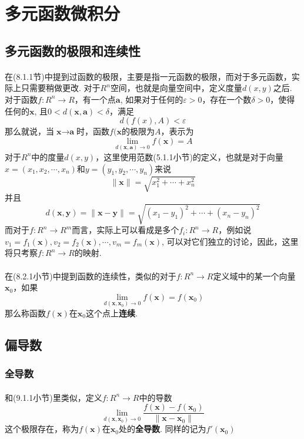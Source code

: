 \section{多元函数微积分}

\subsection{多元函数的极限和连续性}
\paragraph{}
在(8.1.1节)中提到过函数的极限，主要是指一元函数的极限，而对于多元函数，实际上只需要稍做更改. 对于$R^n$空间，也就是向量空间中，定义度量$d(x, y)$之后. 对于函数$f: R^n \to R$，有一个点$\textbf{a}$, 如果对于任何的$\varepsilon > 0$，存在一个数$\delta > 0$，使得任何的$\textbf{x}$, 且$0 < d(\textbf{x}, \textbf{a}) < \delta$，满足
$$
d(f(x), A) < \varepsilon
$$
那么就说，当$\textbf{x} \to \textbf{a}$时，函数$f(\textbf{x}$的极限为$A$，表示为
$$
\lim_{d(\textbf{x}, \textbf{a}) \to 0} f(\textbf{x}) = A
$$
对于$R^n$中的度量$d(x, y)$，这里使用范数(5.1.1小节)的定义，也就是对于向量$x = (x_1, x_2, \cdots, x_n)$和$y = (y_1, y_2, \cdots, y_n)$来说
$$
\parallel \textbf{x} \parallel = \sqrt{x_1^2 + \cdots + x_n^2}
$$
并且
$$
d(\textbf{x}, \textbf{y}) = \parallel \textbf{x} - \textbf{y} \parallel = \sqrt{(x_1 - y_1)^2 + \cdots + (x_n - y_n)^2}
$$
而对于$f: R^n \to R^m$而言，实际上可以看成是多个$f_i: R^n \to R$，例如说$v_1 = f_1(\textbf{x}), v_2 = f_2(\textbf{x}), \cdots, v_m = f_m(\textbf{x})$, 可以对它们独立的讨论，因此，这里将只考察$f: R^n \to R$的映射.

\paragraph{}
在(8.2.1小节)中提到函数的连续性，类似的对于$f: R^n \to R$定义域中的某一个向量$\textbf{x}_0$，如果
$$
\lim_{d(\textbf{x}, \textbf{x}_0) \to 0} f(\textbf{x}) = f(\textbf{x}_0)
$$
那么称函数$f(\textbf{x})$在$\textbf{x}_0$这个点上\textbf{连续}.

\subsection{偏导数}
\subsubsection{全导数}
\paragraph{}
和(9.1.1小节)里类似，定义$f: R^n \to R$中的导数
$$
\lim_{d(\textbf{x}, \textbf{x}_0) \to 0} \frac{f(\textbf{x}) - f(\textbf{x}_0)}{\parallel \textbf{x} - \textbf{x}_0 \parallel}
$$
这个极限存在，称为$f(\textbf{x})$在$\textbf{x}_0$处的\textbf{全导数}. 同样的记为$f'(\textbf{x}_0)$

